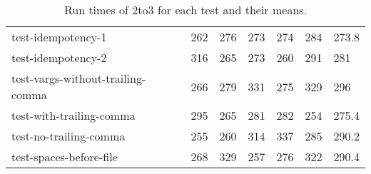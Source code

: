 \begin{table}[h!]
\begin{tabular}{@{}l|p{5em}p{5em}p{5em}p{5em}p{5em}p{5em}@{}}
    test-idempotency-1                  & 262                  & 276                  & 273                  & 274                  & 284                  & 273.8                      \\
    test-idempotency-2                  & 316                  & 265                  & 273                  & 260                  & 291                  & 281                        \\
    test-vargs-without-trailing-comma & 266                  & 279                  & 331                  & 275                  & 329                  & 296                        \\
    test-with-trailing-comma           & 295                  & 265                  & 281                  & 282                  & 254                  & 275.4                      \\
    test-no-trailing-comma             & 255                  & 260                  & 314                  & 337                  & 285                  & 290.2                      \\ 
    test-spaces-before-file            & 268                  & 329                  & 257                  & 276                  & 322                  & 290.4                     \\ \bottomrule
    \end{tabular}
    \caption{Run times of 2to3 for each test and their means.}
    \label{table:2to3-performance}
\end{table}

